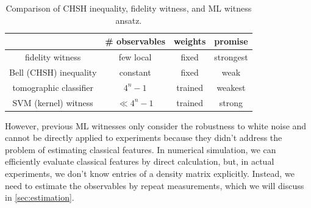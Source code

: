 \documentclass[
reprint,
aps,
pra,
floatfix,
]{revtex4-2}
\theoremstyle{plain}
\theoremstyle{definition}
\begin{document}

\begin{table}[!ht]
	\centering
	\begin{tabular}{c|c|c|c}
		& \# observables & weights & promise \\
		\hline
		fidelity  witness & few local & fixed & strongest  \\  
		Bell (CHSH) inequality & constant & fixed & weak \\  
		tomographic classifier & $4^n-1$ & trained & weakest \\  
		SVM (kernel) witness &  $\ll 4^n-1$ & trained & strong \\  
		\hline
	\end{tabular}
	\caption{Comparison of CHSH inequality, fidelity witness, and ML witness ansatz.}
\end{table}

However, previous ML witnesses only consider the robustness to white noise and cannot be directly applied to experiments because they didn't address the problem of estimating classical features. 
In numerical simulation, we can efficiently evaluate classical features by direct calculation, 
but, in actual experiments, we don't know entries of a density matrix explicitly.
Instead, we need to estimate the observables by repeat measurements, which we will discuss in \cref{sec:estimation}.


\end{document}
